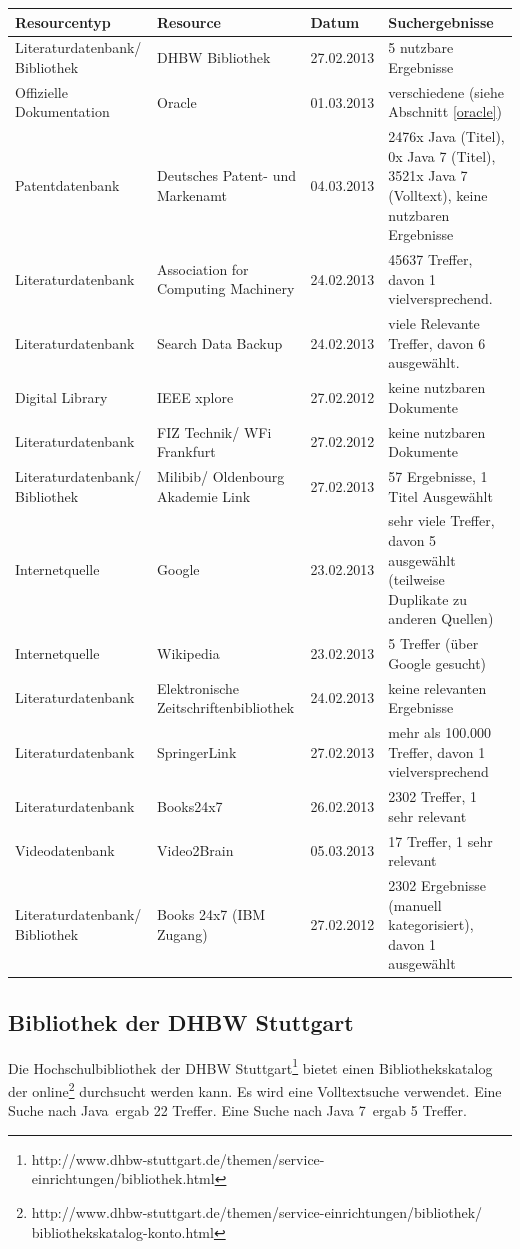 \renewcommand{\arraystretch}{1.5}
\begin{longtable}{p{3.6cm}|p{3.5cm}|l|p{3.5cm}}
Resourcentyp & Resource & Datum & Suchergebnisse\\\hline\endhead
\endfoot\endlastfoot
Literaturdatenbank/ Bibliothek & DHBW Bibliothek & 27.02.2013 & 5 nutzbare Ergebnisse\\
Offizielle Dokumentation & Oracle & 01.03.2013 & verschiedene (siehe Abschnitt \ref{oracle})\\
Patentdatenbank & Deutsches Patent- und Markenamt & 04.03.2013 & 2476x Java (Titel), 0x Java 7 (Titel), 3521x Java 7 (Volltext), keine nutzbaren Ergebnisse\\
Literaturdatenbank & Association for Computing Machinery & 24.02.2013 & 45637 Treffer, davon 1 vielversprechend.\\
Literaturdatenbank & Search Data Backup & 24.02.2013 & viele Relevante Treffer, davon 6 ausgewählt.\\
Digital Library & IEEE xplore & 27.02.2012 & keine nutzbaren Dokumente\\
Literaturdatenbank & FIZ Technik/ WFi Frankfurt & 27.02.2012 & keine nutzbaren Dokumente\\
Literaturdatenbank/ Bibliothek & Milibib/ Oldenbourg Akademie Link & 27.02.2013 & 57 Ergebnisse, 1 Titel Ausgewählt\\
Internetquelle & Google & 23.02.2013 & sehr viele Treffer, davon 5 ausgewählt (teilweise Duplikate zu anderen Quellen)\\
Internetquelle & Wikipedia & 23.02.2013 & 5 Treffer (über Google gesucht)\\
Literaturdatenbank & Elektronische Zeitschriftenbibliothek & 24.02.2013 & keine relevanten Ergebnisse\\
Literaturdatenbank & SpringerLink & 27.02.2013 & mehr als 100.000 Treffer, davon 1 vielversprechend\\
Literaturdatenbank & Books24x7 & 26.02.2013 & 2302 Treffer, 1 sehr relevant\\
Videodatenbank & Video2Brain & 05.03.2013 & 17 Treffer, 1 sehr relevant\\
Literaturdatenbank/ Bibliothek & Books 24x7 (IBM Zugang) & 27.02.2012 & 2302 Ergebnisse (manuell kategorisiert), davon 1 ausgewählt\\
\end{longtable}
\renewcommand{\arraystretch}{1}

\label{startdetails}
\subsection*{Bibliothek der DHBW Stuttgart}
Die Hochschulbibliothek der DHBW Stuttgart\footnote{http://www.dhbw-stuttgart.de/themen/service-einrichtungen/bibliothek.html} bietet einen Bibliothekskatalog der online\footnote{http://www.dhbw-stuttgart.de/themen/service-einrichtungen/bibliothek/\\bibliothekskatalog-konto.html} durchsucht werden kann. Es wird eine Volltextsuche verwendet. Eine Suche nach \glqq Java\grqq ~ergab 22 Treffer. Eine Suche nach \glqq Java 7\grqq ~ergab 5 Treffer.

